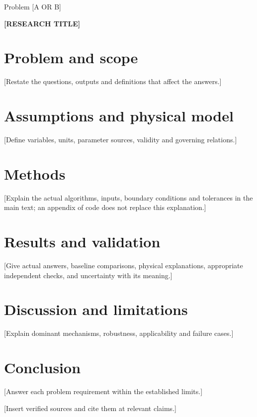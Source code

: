 \documentclass[11pt,a4paper]{article}
\newcommand{\ProblemLetter}{[A OR B]}
\newcommand{\PaperTitle}{[RESEARCH TITLE]}
\begin{document}
\begin{titlepage}
\thispagestyle{summary}
\begin{center}
Problem \ProblemLetter

\vspace{1em}
{\Large\bfseries \PaperTitle\par}
\end{center}
\begin{abstract}
[Replace with a self-contained summary of at most the current word limit
(300 words in the rules verified on 2026-11-07). State the problem,
method and key assumptions, direct answers, principal numerical results
with units, and material conditions. Count the final abstract separately.]
\end{abstract}
\end{titlepage}
\setcounter{page}{2}
\section{Problem and scope}
[Restate the questions, outputs and definitions that affect the answers.]
\section{Assumptions and physical model}
[Define variables, units, parameter sources, validity and governing relations.]
\section{Methods}
[Explain the actual algorithms, inputs, boundary conditions and tolerances
in the main text; an appendix of code does not replace this explanation.]
\section{Results and validation}
[Give actual answers, baseline comparisons, physical explanations,
appropriate independent checks, and uncertainty with its meaning.]
\section{Discussion and limitations}
[Explain dominant mechanisms, robustness, applicability and failure cases.]
\section{Conclusion}
[Answer each problem requirement within the established limits.]
\begin{thebibliography}{99}
 [Insert verified sources and cite them at relevant claims.]
\end{thebibliography}
\clearpage
\end{document}
